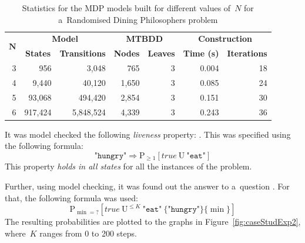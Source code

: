 \documentclass[a4paper, 11pt]{article}
\theoremstyle{definition}
\begin{document}
\begin{table}[hbt]
    \centering

    \begin{tabular}{|r||r|r||r|r||r|r|}
        \hline

        \multicolumn{1}{|c||}{\multirow{2}{*}{$ \boldsymbol{N} $}}
            & \multicolumn{2}{c||}{\textbf{Model}}
            & \multicolumn{2}{c||}{\textbf{MTBDD}}
            & \multicolumn{2}{c|}{\textbf{Construction}} \\ \cline{2-7}

        & \multicolumn{1}{c|}{\textbf{States}}
            & \multicolumn{1}{c||}{\textbf{Transitions}}
            & \multicolumn{1}{c|}{\textbf{Nodes}}
            & \multicolumn{1}{c||}{\textbf{Leaves}}
            & \multicolumn{1}{c|}{\textbf{Time (s)}}
            & \multicolumn{1}{c|}{\textbf{Iterations}} \\ \hline \hline

        3 & 956 & 3,048 & 765 & 3 & 0.004 & 18 \\ \hline
        4 & 9,440 & 40,120 & 1,650 & 3 & 0.085 & 24 \\ \hline
        5 & 93,068 & 494,420 & 2,854 & 3 & 0.151 & 30 \\ \hline
        6 & 917,424 & 5,848,524 & 4,339 & 3 & 0.243 & 36 \\ \hline
    \end{tabular}

    \caption{%
        Statistics for the MDP models built for different values of~$ N $
        for a~Randomised Dining Philosophers problem%
    }
    \label{tab:caseStudModel}
\end{table}

It was model checked the following \emph{liveness} property: . This was specified using the following formula:
$$
    \texttt{"hungry"} \Rightarrow \mathrm{P}_{\geq 1}
    [true\ \mathrm{U}\ \texttt{"eat"}]
$$
This property \emph{holds in all states} for all the instances of the
problem.

Further, using model checking, it was found out the answer to a~question
. For that,
the following formula was used:
$$
    \mathrm{P}_{\min = ?} [true\ \mathrm{U}^{\leq K}\ \texttt{"eat"}\
    \{\texttt{"hungry"}\}\{\min\}]
$$
The resulting probabilities are plotted to the graphs in
Figure~\ref{fig:caseStudExp2}, where~$ K $ ranges from 0 to 200 steps.
\end{document}
